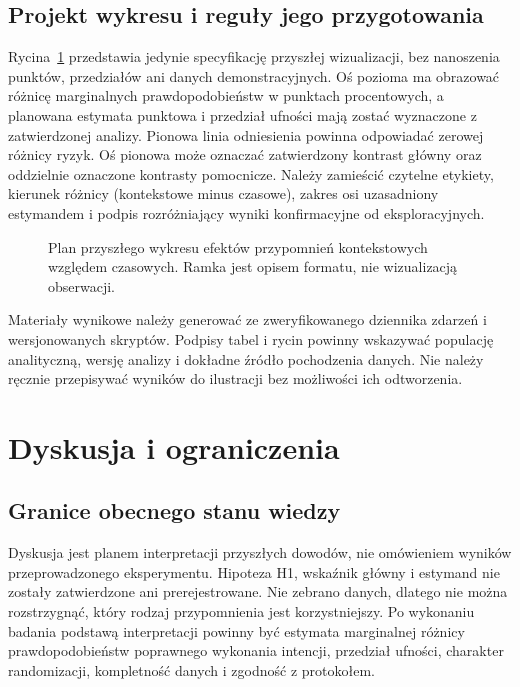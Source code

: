 \documentclass[11pt,a4paper]{article}
\begin{document}
\subsection{Projekt wykresu i reguły jego przygotowania}
Rycina~\ref{fig:effect-plan} przedstawia jedynie specyfikację przyszłej wizualizacji, bez nanoszenia punktów, przedziałów ani danych demonstracyjnych. Oś pozioma ma obrazować różnicę marginalnych prawdopodobieństw w punktach procentowych, a planowana estymata punktowa i przedział ufności mają zostać wyznaczone z zatwierdzonej analizy. Pionowa linia odniesienia powinna odpowiadać zerowej różnicy ryzyk. Oś pionowa może oznaczać zatwierdzony kontrast główny oraz oddzielnie oznaczone kontrasty pomocnicze. Należy zamieścić czytelne etykiety, kierunek różnicy (kontekstowe minus czasowe), zakres osi uzasadniony estymandem i podpis rozróżniający wyniki konfirmacyjne od eksploracyjnych.

\begin{figure}[htbp]
\centering
{}
\caption{Plan przyszłego wykresu efektów przypomnień kontekstowych względem czasowych. Ramka jest opisem formatu, nie wizualizacją obserwacji.}
\label{fig:effect-plan}
\end{figure}

Materiały wynikowe należy generować ze zweryfikowanego dziennika zdarzeń i wersjonowanych skryptów. Podpisy tabel i rycin powinny wskazywać populację analityczną, wersję analizy i dokładne źródło pochodzenia danych. Nie należy ręcznie przepisywać wyników do ilustracji bez możliwości ich odtworzenia.

\section{Dyskusja i ograniczenia}
\subsection{Granice obecnego stanu wiedzy}
Dyskusja jest planem interpretacji przyszłych dowodów, nie omówieniem wyników przeprowadzonego eksperymentu. Hipoteza H1, wskaźnik główny i estymand nie zostały zatwierdzone ani prerejestrowane. Nie zebrano danych, dlatego nie można rozstrzygnąć, który rodzaj przypomnienia jest korzystniejszy. Po wykonaniu badania podstawą interpretacji powinny być estymata marginalnej różnicy prawdopodobieństw poprawnego wykonania intencji, przedział ufności, charakter randomizacji, kompletność danych i zgodność z protokołem.
\end{document}
